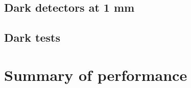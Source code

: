 \documentclass[a4paper, 11pt]{article} %
\begin{document}
\subsection{Dark detectors at 1 mm}


\subsection{Dark tests}

\section{Summary of performance}






\end{document}
